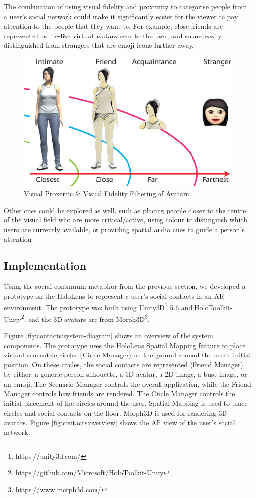 The combination of using visual fidelity and proximity to categorise people from a user's social network could make it significantly easier for the viewer to pay attention to the people that they want to. For example, close friends are represented as life-like virtual avatars near to the user, and so are easily distinguished from strangers that are emoji icons further away.

\begin{figure}[ht]
  \centering
  \includegraphics[width=.8\linewidth]{images/mgia17/writing-images-11.eps}
  \caption{Visual Proxemic \& Visual Fidelity Filtering of Avatars}
    \label{fig:contacts:proximic-circles}
\end{figure}

Other cues could be explored as well, such as placing people closer to the centre of the visual field who are more critical/active, using colour to distinguish which users are currently available, or providing spatial audio cues to guide a person's attention.


\subsection{Implementation}

Using the social continuum metaphor from the previous section, we developed a prototype on the HoloLens to represent a user's social contacts in an AR environment. The prototype was built using Unity3D\footnote{https://unity3d.com/} 5.6 and HoloToolkit-Unity\footnote{https://github.com/Microsoft/HoloToolkit-Unity}, and the 3D avatars are from Morph3D\footnote{https://www.morph3d.com/}. 

Figure \ref{fig:contacts:system-diagram} shows an overview of the system components. The prototype uses the HoloLens Spatial Mapping feature to place virtual concentric circles (Circle Manager) on the ground around the user's initial position. On these circles, the social contacts are represented (Friend Manager) by either: a generic person silhouette, a 3D avatar, a 2D image, a bust image, or an emoji. The Scenario Manager controls the overall application, while the Friend Manager controls how friends are rendered. The Circle Manager controls the initial placement of the circles around the user. Spatial Mapping is used to place circles and social contacts on the floor. Morph3D is used for rendering 3D avatars. Figure \ref{fig:contacts:overview} shows the AR view of the user's social network.


